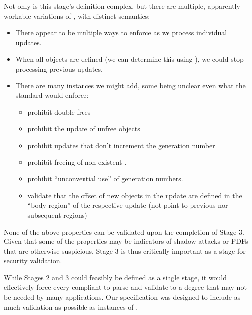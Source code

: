 Not only is this stage's definition complex, but there are multiple, apparently workable variations of , with distinct semantics:
\begin{itemize}
\item There appear to be multiple ways to enforce  as we
  process individual updates.
\item When all objects are defined (we can determine this using
  ), we could stop processing previous updates.
\item There are many  instances we might add,
  some being unclear even what the standard would enforce:
  \begin{itemize}
  \item prohibit double frees
  \item prohibit the update of unfree objects
  \item prohibit updates that don't increment the generation number
  \item prohibit freeing of non-existent \objids{}.
  \item prohibit ``unconvential use'' of generation numbers.
  \item validate that the offset of new objects in the update are
    defined in the ``body region'' of the respective update (not point
    to previous nor subsequent regions)
  \end{itemize}
\end{itemize}
%
None of the above properties can be validated upon the completion of Stage 3.
%
Given that some of the properties may be indicators of shadow attacks or PDFs that are otherwise suspicious, Stage 3 is thus critically important as a stage for security validation.

While Stages 2 and 3 could feasibly be defined as a single stage, it would effectively force every compliant to parse and validate to a degree that may not be needed by many applications.
%
Our specification was designed to include as much validation as possible as instances of .
%


